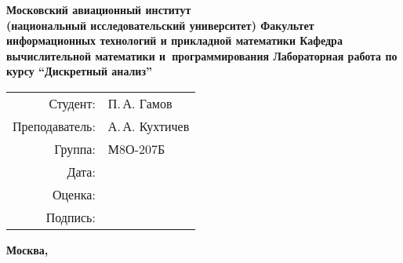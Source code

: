 \begin{titlepage}
\begin{center}
\bfseries
{\Large Московский авиационный институт\\ (национальный исследовательский университет)}
\vspace{48pt}
{\large Факультет информационных технологий и прикладной математики}
\vspace{36pt}
{\large Кафедра вычислительной математики и~программирования}
\vspace{48pt}
Лабораторная работа  по курсу \enquote{Дискретный анализ}
\end{center}
\vspace{72pt}

\begin{flushright}
\begin{tabular}{rl}
Студент: & П.\,А. Гамов \\
Преподаватель: & А.\,А. Кухтичев \\
Группа: & М8О-207Б \\
Дата: & \\
Оценка: & \\
Подпись: & \\
\end{tabular}
\end{flushright}
\vfill
\begin{center}
\bfseries
Москва, \the\year
\end{center}
\end{titlepage}

\pagebreak